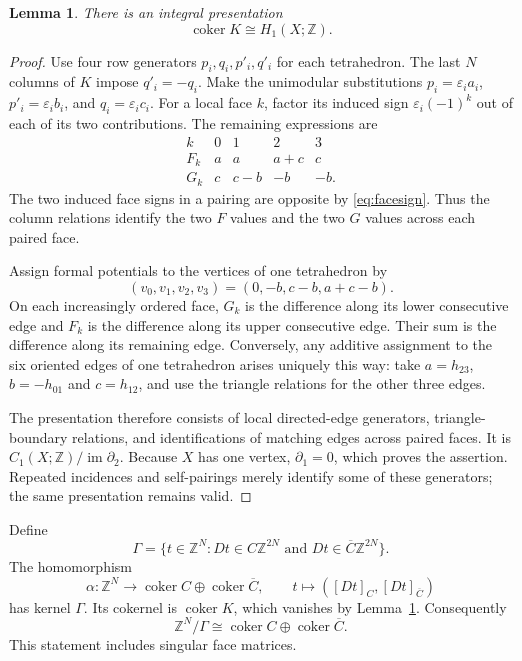 \documentclass[11pt]{article}
\newtheorem{lemma}[theorem]{Lemma}
\theoremstyle{definition}\newtheorem{definition}[theorem]{Definition}
\theoremstyle{remark}\newtheorem{remark}[theorem]{Remark}
\DeclareMathOperator{\im}{im}
\DeclareMathOperator{\coker}{coker}
\newcommand{\Z}{\mathbb Z}
\newcommand{\Ct}{\overline C}
\newcommand{\eps}{\varepsilon}
\begin{document}
\begin{lemma}\label{lem:simultaneous-presentation}
There is an integral presentation
\begin{equation}
 \coker K\cong H_1(X;\Z).
 \label{eq:kcoker}
\end{equation}
\end{lemma}
\begin{proof}
Use four row generators $p_i,q_i,p'_i,q'_i$ for each tetrahedron. The last
$N$ columns of $K$ impose $q'_i=-q_i$. Make the unimodular substitutions
$p_i=\eps_i a_i$, $p'_i=\eps_i b_i$, and $q_i=\eps_i c_i$.
For a local face $k$, factor its induced sign $\eps_i(-1)^k$ out of
each of its two contributions. The remaining expressions are
\[
\begin{array}{c|rrrr}
 k&0&1&2&3\\\hline
 F_k&a&a&a+c&c\\
 G_k&c&c-b&-b&-b.
\end{array}
\]
The two induced face signs in a pairing are opposite by
\eqref{eq:facesign}. Thus the column relations identify the two $F$
values and the two $G$ values across each paired face.

Assign formal potentials to the vertices of one tetrahedron by
\[
 (v_0,v_1,v_2,v_3)=(0,-b,c-b,a+c-b).
\]
On each increasingly ordered face, $G_k$ is the difference along its
lower consecutive edge and $F_k$ is the difference along its upper
consecutive edge. Their sum is the difference along its remaining edge.
Conversely, any additive assignment to the six oriented edges of one
tetrahedron arises uniquely this way: take $a=h_{23}$, $b=-h_{01}$ and
$c=h_{12}$, and use the triangle relations for the other three edges.

The presentation therefore consists of local directed-edge generators,
triangle-boundary relations, and identifications of matching edges across
paired faces. It is $C_1(X;\Z)/\im\partial_2$. Because $X$ has one
vertex, $\partial_1=0$, which proves the assertion. Repeated incidences
and self-pairings merely identify some of these generators; the same
presentation remains valid.
\end{proof}

Define
\[
 \Gamma=\{t\in\Z^N:Dt\in C\Z^{2N}
                   \text{ and }Dt\in\Ct\Z^{2N}\}.
\]
The homomorphism
\[
 \alpha:\Z^N\longrightarrow\coker C\oplus\coker\Ct,
 \qquad t\longmapsto([Dt]_C,[Dt]_{\Ct})
\]
has kernel $\Gamma$. Its cokernel is $\coker K$, which vanishes by
Lemma~\ref{lem:simultaneous-presentation}. Consequently
\begin{equation}
 \Z^N/\Gamma\cong\coker C\oplus\coker\Ct.
 \label{eq:facequotient}
\end{equation}
This statement includes singular face matrices.
\end{document}
